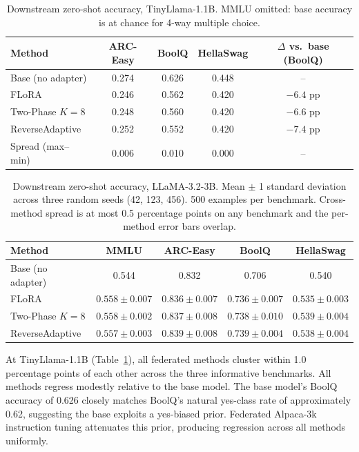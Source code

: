 \begin{table}[!t]
\caption{Downstream zero-shot accuracy, TinyLlama-1.1B. MMLU omitted: base accuracy is at chance for 4-way multiple choice.}
\label{tab:downstream_tiny}
\begin{center}
\begin{tabular}{lcccc}
\toprule
Method & ARC-Easy & BoolQ & HellaSwag & $\Delta$ vs.\ base (BoolQ) \\
\midrule
Base (no adapter) & 0.274 & 0.626 & 0.448 & -- \\
FLoRA             & 0.246 & 0.562 & 0.420 & $-6.4$ pp \\
Two-Phase $K{=}8$ & 0.248 & 0.560 & 0.420 & $-6.6$ pp \\
ReverseAdaptive   & 0.252 & 0.552 & 0.420 & $-7.4$ pp \\
Spread (max--min) & 0.006 & 0.010 & 0.000 & -- \\
\bottomrule
\end{tabular}
\end{center}
\end{table}

\begin{table}[!t]
\caption{Downstream zero-shot accuracy, LLaMA-3.2-3B. Mean $\pm$ 1 standard deviation across three random seeds (42, 123, 456). 500 examples per benchmark. Cross-method spread is at most 0.5 percentage points on any benchmark and the per-method error bars overlap.}
\label{tab:downstream_llama}
\begin{center}
\setlength{\tabcolsep}{6pt}
\begin{tabular}{lcccc}
\toprule
Method & MMLU & ARC-Easy & BoolQ & HellaSwag \\
\midrule
Base (no adapter) & 0.544 & 0.832 & 0.706 & 0.540 \\
FLoRA             & $0.558 \pm 0.007$ & $0.836 \pm 0.007$ & $0.736 \pm 0.007$ & $0.535 \pm 0.003$ \\
Two-Phase $K{=}8$ & $0.558 \pm 0.002$ & $0.837 \pm 0.008$ & $0.738 \pm 0.010$ & $0.539 \pm 0.004$ \\
ReverseAdaptive   & $0.557 \pm 0.003$ & $0.839 \pm 0.008$ & $0.739 \pm 0.004$ & $0.538 \pm 0.004$ \\
\bottomrule
\end{tabular}
\end{center}
\end{table}

At TinyLlama-1.1B (Table~\ref{tab:downstream_tiny}), all federated methods cluster within 1.0 percentage points of each other across the three informative benchmarks. All methods regress modestly relative to the base model. The base model's BoolQ accuracy of 0.626 closely matches BoolQ's natural yes-class rate of approximately 0.62, suggesting the base exploits a yes-biased prior. Federated Alpaca-3k instruction tuning attenuates this prior, producing regression across all methods uniformly.

